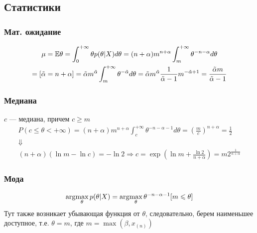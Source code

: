 \subsection{Статистики}
\subsubsection{Мат. ожидание}
\begin{solution}
    \begin{gather}
        \mu = \mathbb{E} \theta = \int_0^{+\infty} \theta p(\theta | X) d\theta = (n + \alpha) m^{n + \alpha} \int_m^{+\infty}\theta^{-n - \alpha} d\theta \\
        = [\tilde{\alpha} = n + \alpha] = \tilde{\alpha}m^{\tilde{\alpha}}\int_m^{+\infty}\theta^{-\tilde{\alpha}} d\theta = \tilde{\alpha} m^{\tilde{\alpha}} \frac{1}{\tilde{\alpha} - 1} m^{-\tilde{\alpha} + 1} = \frac{\tilde{\alpha}m}{\tilde{\alpha} - 1}
    \end{gather}
\end{solution}

\subsubsection{Медиана}
\begin{solution}
    $c$ --- медиана, причем $c \ge m$
    \begin{gather}
        P(c \le \theta < +\infty) = (n + \alpha)m^{n + \alpha}\int_c^{+\infty} \theta^{-n - \alpha - 1} d\theta = \left(\frac{m}{c}\right)^{n + \alpha} = \frac12 \\
        \Downarrow \\
        (n + \alpha)(\ln m - \ln c) = -\ln 2 \Longrightarrow c = \exp(\ln m + \frac{\ln 2}{n + \alpha}) = m 2^{\frac{1}{n + \alpha}}
    \end{gather}
\end{solution}

\subsubsection{Мода}
\begin{solution}
    \begin{gather}
        \arg\!\max_{\theta} p(\theta | X) = \arg\!\max_{\theta} \theta^{-n - \alpha - 1}[m \leqslant \theta]
    \end{gather}
    Тут также возникает убывающая функция от $\theta$, следовательно, берем наименьшее доступное, т.е. $\theta = m$, где $m = \max(\beta, x_{(n)})$
\end{solution}

\newpage
